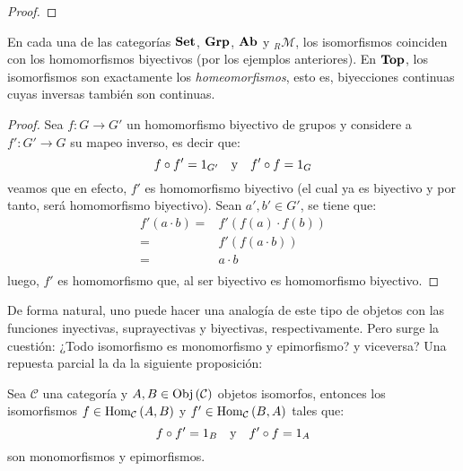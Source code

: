 \documentclass[12pt]{report}
\theoremstyle{largebreak}
\newcommand\cf[3]{\ensuremath{#1:#2\rightarrow#3}}
\newcommand{\Obj}[1]{\ensuremath{\textup{Obj}\left(#1\right)}}
\newcommand{\Hom}[3]{\ensuremath{\textup{Hom}_{#1}\left(#2,#3\right)}}
\newcommand{\Cat}[1]{\ensuremath{\textup{\textbf{#1}}}}
\begin{document}
    \begin{proof}
        
    \end{proof}

    \begin{exa}
        En cada una de las categorías $\Cat{Set}$, $\Cat{Grp}$, $\Cat{Ab}$ y $_R\mathcal{M}$, los isomorfismos coinciden con los homomorfismos biyectivos (por los ejemplos anteriores). En $\Cat{Top}$, los isomorfismos son exactamente los \textit{homeomorfismos}, esto es, biyecciones continuas cuyas inversas también son continuas.
    \end{exa}

    \begin{proof}
        Sea $\cf{f}{G}{G'}$ un homomorfismo biyectivo de grupos y considere a $\cf{f'}{G'}{G}$ su mapeo inverso, es decir que:
        \begin{equation*}
            f\circ f'=1_{G'}\quad\textup{y}\quad f'\circ f=1_G
        \end{equation*}
        veamos que en efecto, $f'$ es homomorfismo biyectivo (el cual ya es biyectivo y por tanto, será homomorfismo biyectivo). Sean $a',b'\in G'$, se tiene que:
        \begin{equation*}
            \begin{split}
                f'(a\cdot b)=&f'(f(a)\cdot f(b))\\
                =&f'(f(a\cdot b))\\
                =&a\cdot b\\
            \end{split}
        \end{equation*}
        luego, $f'$ es homomorfismo que, al ser biyectivo es homomorfismo biyectivo. 
    \end{proof}

    De forma natural, uno puede hacer una analogía de este tipo de objetos con las funciones inyectivas, suprayectivas y biyectivas, respectivamente. Pero surge la cuestión: ¿Todo isomorfismo es monomorfismo y epimorfismo? y viceversa? Una repuesta parcial la da la siguiente proposición:

    \begin{propo}
        Sea $\mathcal{C}$ una categoría y $A,B\in\Obj{\mathcal{C}}$ objetos isomorfos, entonces los isomorfismos $f\in\Hom{\mathcal{C}}{A}{B}$ y $f'\in\Hom{\mathcal{C}}{B}{A}$ tales que:
        \begin{equation*}
            f\circ f'=1_B\quad\textup{y}\quad f'\circ f=1_A
        \end{equation*}
        son monomorfismos y epimorfismos.
    \end{propo}
    
\end{document}
